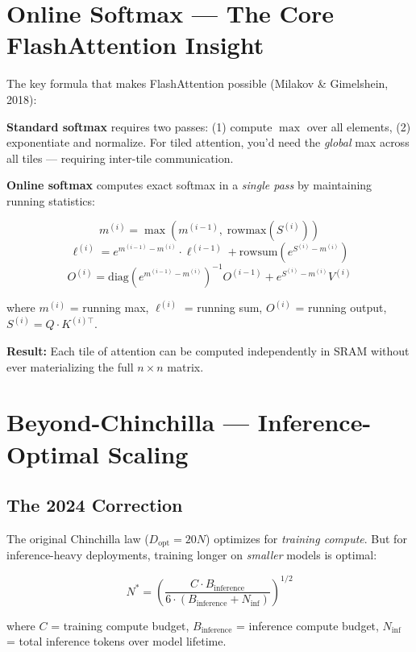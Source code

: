 \documentclass[11pt,a4paper]{article}
\begin{document}
\section{Online Softmax --- The Core FlashAttention Insight}

The key formula that makes FlashAttention possible (Milakov \& Gimelshein, 2018):

\textbf{Standard softmax} requires two passes: (1) compute $\max$ over all elements, (2) exponentiate and normalize. For tiled attention, you'd need the \textit{global} max across all tiles --- requiring inter-tile communication.

\textbf{Online softmax} computes exact softmax in a \textit{single pass} by maintaining running statistics:

$$m^{(i)} = \max\!\left(m^{(i-1)},\; \text{rowmax}(S^{(i)})\right)$$
$$\ell^{(i)} = e^{m^{(i-1)} - m^{(i)}} \cdot \ell^{(i-1)} + \text{rowsum}\!\left(e^{S^{(i)} - m^{(i)}}\right)$$
$$O^{(i)} = \text{diag}\!\left(e^{m^{(i-1)} - m^{(i)}}\right)^{-1} O^{(i-1)} + e^{S^{(i)} - m^{(i)}} V^{(i)}$$

where $m^{(i)}$ = running max, $\ell^{(i)}$ = running sum, $O^{(i)}$ = running output, $S^{(i)} = Q \cdot K^{(i)\top}$.

\textbf{Result:} Each tile of attention can be computed independently in SRAM without ever materializing the full $n \times n$ matrix.

\section{Beyond-Chinchilla --- Inference-Optimal Scaling}

\subsection{The 2024 Correction}

The original Chinchilla law ($D_{\text{opt}} = 20N$) optimizes for \textit{training compute}. But for inference-heavy deployments, training longer on \textit{smaller} models is optimal:

$$N^* = \left(\frac{C \cdot B_{\text{inference}}}{6 \cdot (B_{\text{inference}} + N_{\text{inf}})}\right)^{1/2}$$

where $C$ = training compute budget, $B_{\text{inference}}$ = inference compute budget, $N_{\text{inf}}$ = total inference tokens over model lifetime.
\end{document}
